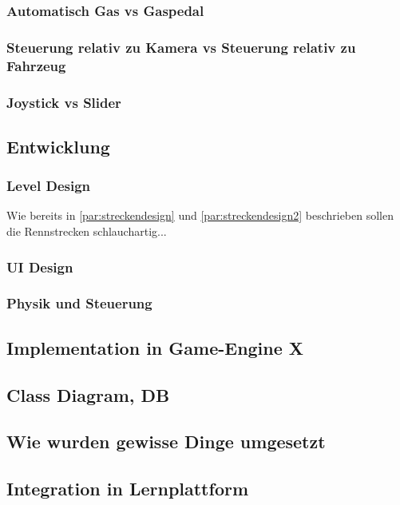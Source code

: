 	\subsubsection{Automatisch Gas vs Gaspedal}
	\subsubsection{Steuerung relativ zu Kamera vs Steuerung relativ zu Fahrzeug}
	\subsubsection{Joystick vs Slider}
\subsection{Entwicklung}
	\subsubsection{Level Design}
		Wie bereits in \ref{par:streckendesign} und \ref{par:streckendesign2} beschrieben sollen die Rennstrecken schlauchartig...
	\subsubsection{UI Design}
	\subsubsection{Physik und Steuerung}
	\subsubsection{}
\subsection{Implementation in Game-Engine X}
\subsection{Class Diagram, DB}
\subsection{Wie wurden gewisse Dinge umgesetzt}
\subsection{Integration in Lernplattform}
